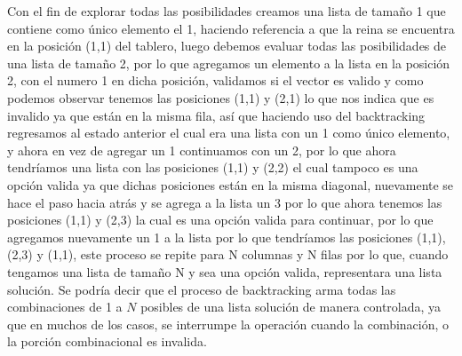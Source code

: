 \documentclass[12pt,a4paper]{article}
\begin{document}
\begin{enumerate}
Con el fin de explorar todas las posibilidades creamos una lista de tamaño 1 que contiene como único elemento el 1, haciendo referencia a que la reina se encuentra en la posición (1,1) del tablero, luego debemos evaluar todas las posibilidades de una lista de tamaño 2, por lo que agregamos un elemento a la lista en la posición 2, con el numero 1 en dicha posición,  validamos si el vector es valido y como podemos observar tenemos las posiciones (1,1) y (2,1) lo que nos indica que es invalido ya que están en la misma fila, así que haciendo uso del backtracking regresamos al estado anterior el cual era una lista con un 1 como único elemento, y ahora en vez de agregar un 1 continuamos con un 2, por lo que ahora tendríamos una lista con las posiciones (1,1) y (2,2) el cual tampoco es una opción valida ya que dichas posiciones están en la misma diagonal, nuevamente se hace el paso hacia atrás y se agrega a la lista un 3 por lo que ahora tenemos las posiciones (1,1) y (2,3) la cual es una opción valida para continuar, por lo que agregamos nuevamente un 1 a la lista por lo que tendríamos las posiciones (1,1), (2,3) y (1,1), este proceso se repite para N columnas y N filas por lo que, cuando tengamos una lista de tamaño N y sea una opción valida, representara una lista solución. Se podría decir que el proceso de backtracking arma todas las combinaciones de 1 a $N$ posibles de una lista solución de manera controlada, ya que en muchos de los casos, se interrumpe la operación cuando la combinación, o la porción combinacional es invalida.

\end{enumerate}
\end{document}
